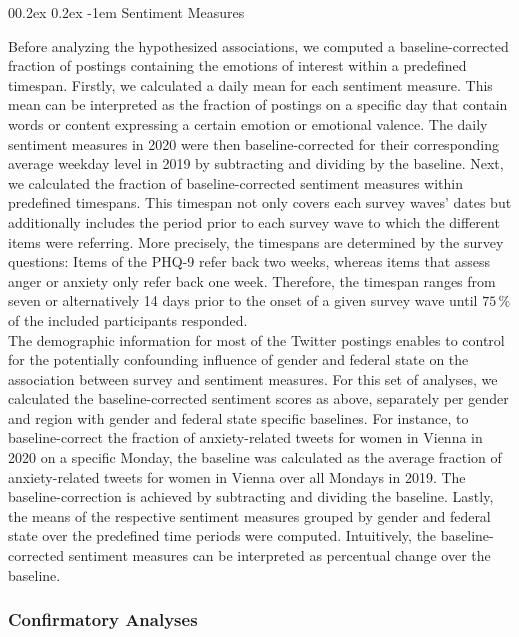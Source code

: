 \documentclass[
  english,
  jou,floatsintext]{apa7}
\makeatletter
\let\oldparagraph\paragraph
\renewcommand{\paragraph}[1]{\oldparagraph{#1}\mbox{}}
\renewcommand{\paragraph}{\@startsection{paragraph}{4}{\parindent}%
  {0\baselineskip \@plus 0.2ex \@minus 0.2ex}%
  {-1em}%
  {\normalfont\normalsize\bfseries\itshape\typesectitle}}
\makeatother
\begin{document}
\hypertarget{sentiment-measures}{%
\paragraph{Sentiment Measures}\label{sentiment-measures}}

Before analyzing the hypothesized associations, we computed a baseline-corrected fraction of postings containing the emotions of interest within a predefined timespan. Firstly, we calculated a daily mean for each sentiment measure. This mean can be interpreted as the fraction of postings on a specific day that contain words or content expressing a certain emotion or emotional valence.
The daily sentiment measures in 2020 were then baseline-corrected for their corresponding average weekday level in 2019 by subtracting and dividing by the baseline. Next, we calculated the fraction of baseline-corrected sentiment measures within predefined timespans. This timespan not only covers each survey waves' dates but additionally includes the period prior to each survey wave to which the different items were referring. More precisely, the timespans are determined by the survey questions: Items of the PHQ-9 refer back two weeks, whereas items that assess anger or anxiety only refer back one week. Therefore, the timespan ranges from seven or alternatively 14 days prior to the onset of a given survey wave until \(75\,\%\) of the included participants responded.\\
The demographic information for most of the Twitter postings enables to control for the potentially confounding influence of gender and federal state on the association between survey and sentiment measures. For this set of analyses, we calculated the baseline-corrected sentiment scores as above, separately per gender and region with gender and federal state specific baselines. For instance, to baseline-correct the fraction of anxiety-related tweets for women in Vienna in 2020 on a specific Monday, the baseline was calculated as the average fraction of anxiety-related tweets for women in Vienna over all Mondays in 2019. The baseline-correction is achieved by subtracting and dividing the baseline. Lastly, the means of the respective sentiment measures grouped by gender and federal state over the predefined time periods were computed. Intuitively, the baseline-corrected sentiment measures can be interpreted as percentual change over the baseline.

\hypertarget{confirmatory-analyses}{%
\subsubsection{Confirmatory Analyses}\label{confirmatory-analyses}}
\end{document}
